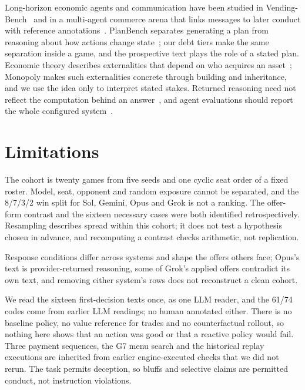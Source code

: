 Long-horizon economic agents and communication have been studied in Vending-Bench~\cite{backlund2025vendingbench} and in a multi-agent commerce arena that links messages to later conduct with reference annotations~\cite{li2026arena}. PlanBench separates generating a plan from reasoning about how actions change state~\cite{valmeekam2023planbench}; our debt tiers make the same separation inside a game, and the prospective text plays the role of a stated plan. Economic theory describes externalities that depend on who acquires an asset~\cite{jehiel1996externalities}; Monopoly makes such externalities concrete through building and inheritance, and we use the idea only to interpret stated stakes. Returned reasoning need not reflect the computation behind an answer~\cite{turpin2023unfaithful,lanham2023faithfulness}, and agent evaluations should report the whole configured system~\cite{kapoor2026hal}.

\section{Limitations}
The cohort is twenty games from five seeds and one cyclic seat order of a fixed roster. Model, seat, opponent and random exposure cannot be separated, and the 8/7/3/2 win split for Sol, Gemini, Opus and Grok is not a ranking. The offer-form contrast and the sixteen necessary cases were both identified retrospectively. Resampling describes spread within this cohort; it does not test a hypothesis chosen in advance, and recomputing a contrast checks arithmetic, not replication.

Response conditions differ across systems and shape the offers others face; Opus's text is provider-returned reasoning, some of Grok's applied offers contradict its own text, and removing either system's rows does not reconstruct a clean cohort.

We read the sixteen first-decision texts once, as one LLM reader, and the 61/74 codes come from earlier LLM readings; no human annotated either. There is no baseline policy, no value reference for trades and no counterfactual rollout, so nothing here shows that an action was good or that a reactive policy would fail. Three payment sequences, the G7 menu search and the historical replay executions are inherited from earlier engine-executed checks that we did not rerun. The task permits deception, so bluffs and selective claims are permitted conduct, not instruction violations.

